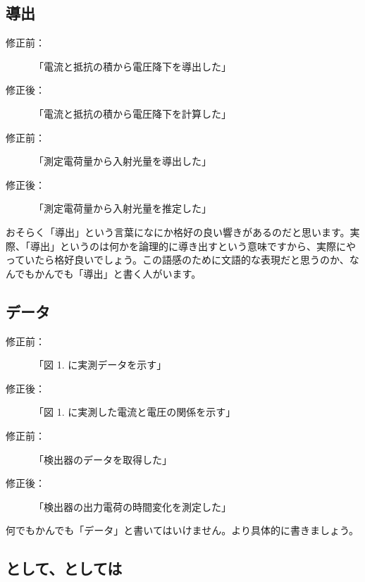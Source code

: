 

\subsection{導出}

\begin{description}
\item[修正前：]「電流と抵抗の積から電圧降下を導出した」
\item[修正後：]「電流と抵抗の積から電圧降下を計算した」
\end{description}
\begin{description}
\item[修正前：]「測定電荷量から入射光量を導出した」
\item[修正後：]「測定電荷量から入射光量を推定した」
\end{description}

おそらく「導出」という言葉になにか格好の良い響きがあるのだと思います。実際、「導出」というのは何かを論理的に導き出すという意味ですから、実際にやっていたら格好良いでしょう。この語感のために文語的な表現だと思うのか、なんでもかんでも「導出」と書く人がいます。

\subsection{データ}

\begin{description}
\item[修正前：]「図 1. に実測データを示す」
\item[修正後：]「図 1. に実測した電流と電圧の関係を示す」
\end{description}
\begin{description}
\item[修正前：]「検出器のデータを取得した」
\item[修正後：]「検出器の出力電荷の時間変化を測定した」
\end{description}

何でもかんでも「データ」と書いてはいけません。より具体的に書きましょう。

\subsection{として、としては}

